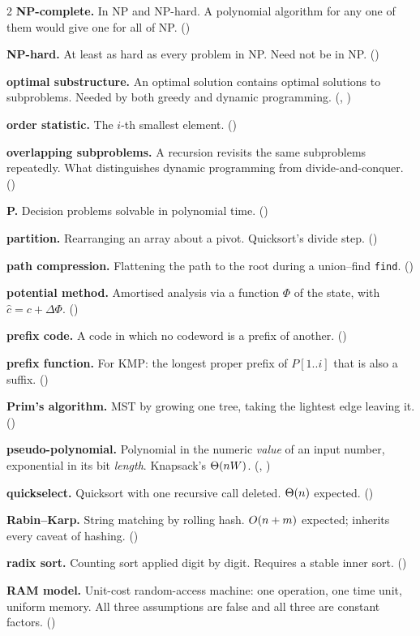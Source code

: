 \begin{multicols}{2}
\textbf{NP-complete.} In NP and NP-hard. A polynomial algorithm for any one of
them would give one for all of NP. ()

\textbf{NP-hard.} At least as hard as every problem in NP. Need not be in NP.
()

\textbf{optimal substructure.} An optimal solution contains optimal solutions
to subproblems. Needed by both greedy and dynamic programming.
(, )

\textbf{order statistic.} The $i$-th smallest element. ()

\textbf{overlapping subproblems.} A recursion revisits the same subproblems
repeatedly. What distinguishes dynamic programming from divide-and-conquer.
()

\textbf{P.} Decision problems solvable in polynomial time.
()

\textbf{partition.} Rearranging an array about a pivot. Quicksort's divide
step. ()

\textbf{path compression.} Flattening the path to the root during a
union--find \texttt{find}. ()

\textbf{potential method.} Amortised analysis via a function $\Phi$ of the
state, with $\hat c = c + \Delta\Phi$. ()

\textbf{prefix code.} A code in which no codeword is a prefix of another.
()

\textbf{prefix function.} For KMP: the longest proper prefix of
$P[1..i]$ that is also a suffix. ()

\textbf{Prim's algorithm.} MST by growing one tree, taking the lightest edge
leaving it. ()

\textbf{pseudo-polynomial.} Polynomial in the numeric \emph{value} of an input
number, exponential in its bit \emph{length}. Knapsack's $\Theta(nW)$.
(, )

\textbf{quickselect.} Quicksort with one recursive call deleted. $\Theta(n)$
expected. ()

\textbf{Rabin--Karp.} String matching by rolling hash. $O(n+m)$ expected;
inherits every caveat of hashing. ()

\textbf{radix sort.} Counting sort applied digit by digit. Requires a stable
inner sort. ()

\textbf{RAM model.} Unit-cost random-access machine: one operation, one time
unit, uniform memory. All three assumptions are false and all three are
constant factors. ()


\end{multicols}
